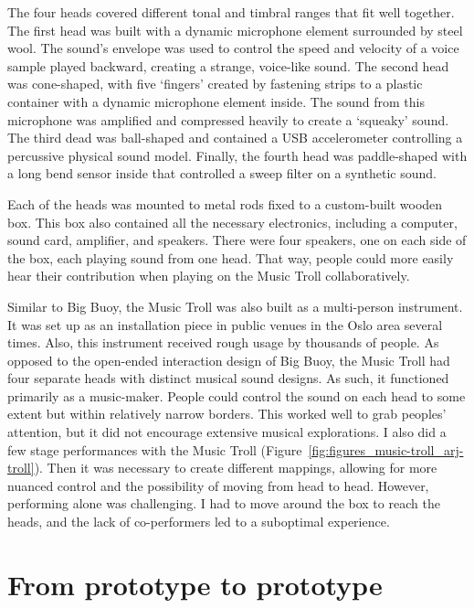 The four heads covered different tonal and timbral ranges that fit well together. The first head was built with a dynamic microphone element surrounded by steel wool. The sound's envelope was used to control the speed and velocity of a voice sample played backward, creating a strange, voice-like sound. The second head was cone-shaped, with five `fingers' created by fastening strips to a plastic container with a dynamic microphone element inside. The sound from this microphone was amplified and compressed heavily to create a `squeaky' sound. The third dead was ball-shaped and contained a USB accelerometer controlling a percussive physical sound model. Finally, the fourth head was paddle-shaped with a long bend sensor inside that controlled a sweep filter on a synthetic sound.

Each of the heads was mounted to metal rods fixed to a custom-built wooden box. This box also contained all the necessary electronics, including a computer, sound card, amplifier, and speakers. There were four speakers, one on each side of the box, each playing sound from one head. That way, people could more easily hear their contribution when playing on the Music Troll collaboratively.

Similar to Big Buoy, the Music Troll was also built as a multi-person instrument. It was set up as an installation piece in public venues in the Oslo area several times. Also, this instrument received rough usage by thousands of people. As opposed to the open-ended interaction design of Big Buoy, the Music Troll had four separate heads with distinct musical sound designs. As such, it functioned primarily as a music-maker. People could control the sound on each head to some extent but within relatively narrow borders. This worked well to grab peoples' attention, but it did not encourage extensive musical explorations. I also did a few stage performances with the Music Troll (Figure~\ref{fig:figures_music-troll_arj-troll}). Then it was necessary to create different mappings, allowing for more nuanced control and the possibility of moving from head to head. However, performing alone was challenging. I had to move around the box to reach the heads, and the lack of co-performers led to a suboptimal experience.


\section{From prototype to prototype}

